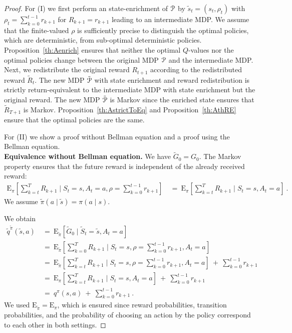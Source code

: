 \documentclass{article}
\newcommand\EXP{\mathbf{\mathrm{E}}}
\begin{document}
\begin{appendices}
\begin{proof}
For (I) we first perform an state-enrichment of $\mathcal{P}$ by
$\tilde{s}_t =  (s_t,\rho_t)$ with $\rho_t=  \sum_{k=0}^{t-1}
r_{k+1}$ for $R_{k+1}=r_{k+1}$ leading to an intermediate MDP.
We assume that the finite-valued $\rho$ is 
sufficiently precise to distinguish the 
optimal policies, which are deterministic, 
from sub-optimal deterministic policies. 
Proposition~\ref{th:Aenrich} ensures that 
neither the optimal $Q$-values 
nor the optimal policies change between the original MDP $\mathcal{P}$
and the intermediate MDP.
Next, we redistribute the original reward $R_{t+1}$ 
according to the redistributed reward $\tilde{R}_t$. 
The new MDP $\tilde{\mathcal{P}}$ with state enrichment and reward redistribution
is strictly return-equivalent to 
the intermediate MDP with state enrichment but the original reward.
The new MDP $\tilde{\mathcal{P}}$ is Markov since the enriched state ensures that
$\tilde{R}_{T+1}$ is Markov.
Proposition~\ref{th:AstrictToEq} and Proposition~\ref{th:AthRE} ensure that
the optimal policies are the same.

For (II) we show a proof without Bellman equation and a proof using
the Bellman equation.\\
{\bf Equivalence without Bellman equation.}
We have $\tilde{G}_0=G_0$.
The Markov property ensures that the future reward is independent of
the already received reward:
\begin{align}
  \EXP_{\pi} \left[ \sum_{k=t}^{T}  R_{k+1} \mid S_t=s, A_t=
  a, \rho=\sum_{k=0}^{t-1}  r_{k+1}\right] \ &= \ \EXP_{\pi}
  \left[ \sum_{k=t}^{T}  R_{k+1} \mid S_t=s, A_t=a \right] \ .
\end{align}
We assume $\tilde{\pi}(a \mid \tilde{s})=\pi(a \mid s)$.

We obtain
\begin{align}
 \tilde{q}^{\tilde{\pi}}(\tilde{s},a) \ &= \ \EXP_{\tilde{\pi}} \left[
 \tilde{G}_0 \mid \tilde{S}_t=\tilde{s}, A_t=a \right] \\ \nonumber
 &= \ \EXP_{\tilde{\pi}} \left[ \sum_{k=0}^{T}  R_{k+1}
 \mid S_t=s,  \rho=\sum_{k=0}^{t-1}  r_{k+1} , A_t= a \right] \\ \nonumber
 &= \ \EXP_{\tilde{\pi}} \left[ \sum_{k=t}^{T}  R_{k+1}
 \mid S_t=s, \rho=\sum_{k=0}^{t-1}  r_{k+1} , A_t= a \right] \ + \
  \sum_{k=0}^{t-1}   r_{k+1}\\ \nonumber
 &= \ \EXP_{\pi} \left[ \sum_{k=t}^{T}  R_{k+1}
 \mid S_t=s, A_t= a \right] \ + \ \sum_{k=0}^{t-1}  r_{k+1}\\ \nonumber
 &= \ q^{\pi}(s,a) \ + \ \sum_{k=0}^{t-1}  r_{k+1} \ .
\end{align} 
We used $\EXP_{\tilde{\pi}} =\EXP_{\pi}$, which is ensured
since reward probabilities, transition probabilities, and
the probability of choosing an action by the policy correspond to each
other in both settings.  



\end{proof}
\end{appendices}
\end{document}
